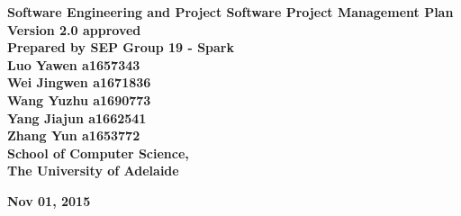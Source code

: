 \documentclass[11pt, a4paper]{article}
\begin{document}
\begin{titlepage}

\begin{center}

	\vspace{0.5 cm}
	\fontsize{35}{35}\selectfont\bf {Software Engineering and Project
Software Project Management Plan}\\
	
	
	\vspace{2cm}
	\Large\textbf{ Version 2.0 approved}\\
	
	\vspace{1.5cm}
	\Large\textbf {Prepared by SEP Group 19 - Spark\\
								Luo Yawen a1657343 \\
								Wei Jingwen a1671836 \\
								Wang Yuzhu a1690773 \\
								Yang Jiajun a1662541\\
								Zhang Yun a1653772}\\
		
	\vspace{2cm}
	\Large\textbf{ School of Computer Science,\\
								The University of Adelaide}\\
	\vspace{2cm}
	
	\Large\textbf{ Nov 01, 2015}\\

\end{center}

\end{titlepage}

\tableofcontents

\vspace{1cm}
\end{document}
